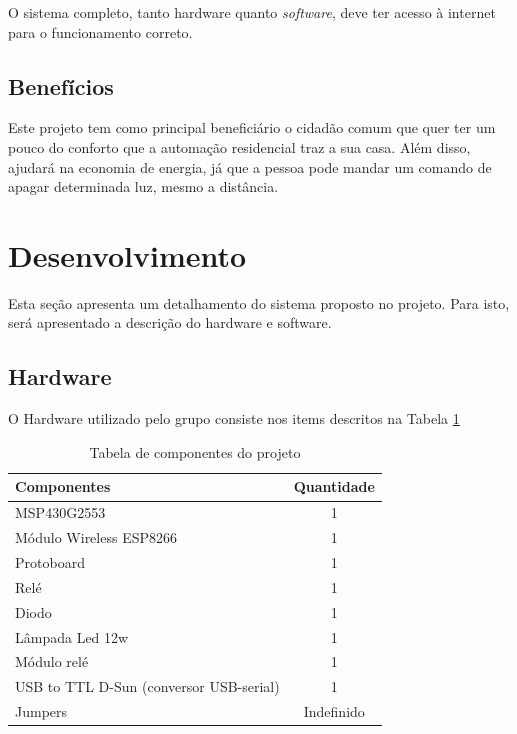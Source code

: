 \documentclass[12pt,journal,compsoc]{IEEEtran}
\begin{document}
O sistema completo, tanto hardware quanto \textit{software}, deve ter acesso à internet para o funcionamento correto.

\subsection{Benefícios}

Este projeto tem como principal beneficiário o cidadão comum que quer ter um pouco do conforto que a automação residencial traz a sua casa. Além disso, ajudará na economia de energia, já que a pessoa pode mandar um comando de apagar determinada luz, mesmo a distância.

\section{Desenvolvimento}

Esta seção apresenta um detalhamento do sistema proposto no projeto. Para isto, será apresentado a descrição do hardware e software.

\subsection{Hardware}

O Hardware utilizado pelo grupo consiste nos items descritos na Tabela \ref{tab:componentes}

\begin{table}[h!]
\centering
\caption{Tabela de componentes do projeto}
\label{tab:componentes}
\begin{tabular}{|l|c|}
\hline
Componentes & Quantidade \\ \hline
MSP430G2553 & 1 \\ \hline
Módulo Wireless ESP8266 & 1 \\ \hline
Protoboard  & 1 \\ \hline
Relé & 1 \\ \hline
Diodo & 1 \\ \hline
Lâmpada Led 12w  & 1 \\ \hline
Módulo relé  & 1 \\ \hline
USB to TTL D-Sun (conversor USB-serial)  & 1 \\ \hline
Jumpers & Indefinido  \\ \hline
\end{tabular}
\end{table}
\end{document}
